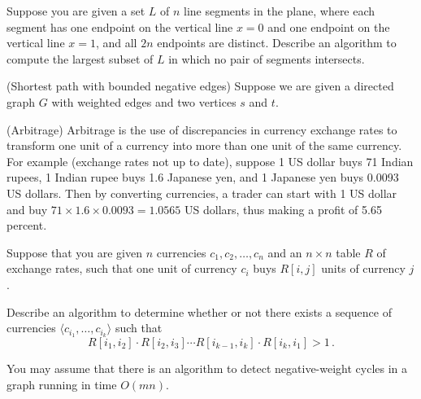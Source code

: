 \begin{questions}

  \question[15] Suppose you are given a set $L$ of $n$ line segments
  in the plane, where each segment has one endpoint on the vertical
  line $x = 0$ and one endpoint on the vertical line $x = 1$, and all
  $2n$ endpoints are distinct. Describe an algorithm to compute the
  largest subset of $L$ in which no pair of segments intersects.

\newpage

\question (Shortest path with bounded negative edges) Suppose we are
given a directed graph $G$ with weighted edges and two vertices $s$
and $t$.
\newpage

\question (Arbitrage) Arbitrage is the use of discrepancies in
currency exchange rates to transform one unit of a currency into more
than one unit of the same currency. For example (exchange rates not
up to date), suppose 1 US dollar buys 71 Indian rupees, 1 Indian rupee
buys 1.6 Japanese yen, and 1 Japanese yen buys 0.0093 US dollars. Then
by converting currencies, a trader can start with 1 US dollar and buy
$71\times 1.6 \times 0.0093 = 1.0565$ US dollars, thus making a profit
of 5.65 percent.

Suppose that you are given $n$ currencies $c_1,c_2,\ldots,c_n$ and an
$n\times n$ table $R$ of exchange rates, such that one unit of
currency $c_i$ buys $R[i,j]$ units of currency $j$.

Describe an algorithm to determine whether or not there exists a
sequence of currencies $\langle c_{i_1},\ldots, c_{i_k}\rangle $ such
that
\[ R[i_1,i_2] \cdot R[i_2,i_3] \cdots R[i_{k-1},i_k]\cdot R[i_k, i_1]
  > 1 \, .\]

You may assume that there is an algorithm to detect negative-weight
cycles in a graph running in time $O(mn)$.

\end{questions}





